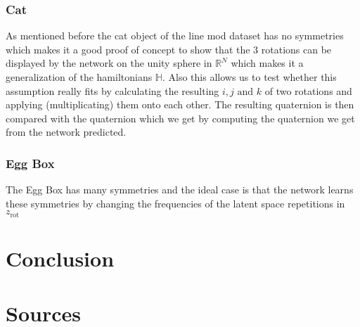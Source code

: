 \documentclass[10pt,a4paper]{article}
\newcommand{\rot}{\ensuremath{\text{rot}\xspace}}
\begin{document}
\subsubsection{Cat}
As mentioned before the cat object of the line mod dataset has no symmetries which makes it a good proof of concept to show that the 3 rotations can be displayed by the network on the unity sphere in $\mathbb{R}^N$ which makes it a generalization of the hamiltonians $\mathbb{H}$. Also this allows us to test whether this assumption really fits by calculating the resulting $i, j \text{ and } k$ of two rotations and applying (multiplicating) them onto each other. The resulting quaternion is then compared with the quaternion which we get by computing the quaternion we get from the network predicted.

\subsubsection{Egg Box}
The Egg Box has many symmetries and the ideal case is that the network learns these symmetries by changing the frequencies of the latent space repetitions in $z_{\rot}$
\section{Conclusion}
\section{Sources}\label{Sources}
\printbibliography*
\end{document}
